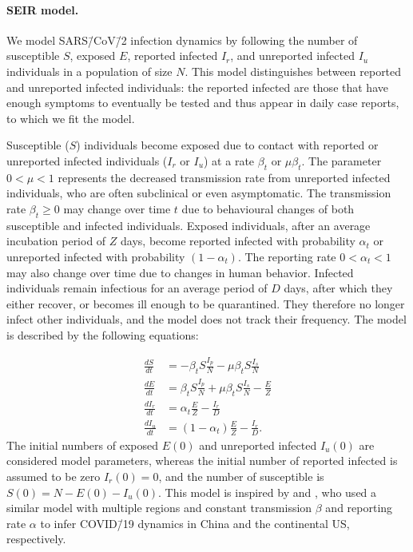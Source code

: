 \documentclass[12pt]{extarticle}
\begin{document}
\paragraph*{SEIR model.}
We model SARS\=/CoV\=/2 infection dynamics by following the number of susceptible $S$, exposed $E$, reported infected $I_r$, and unreported infected $I_u$ individuals in a population of size $N$.
This model distinguishes between reported and unreported infected individuals: the reported infected are those that have enough symptoms to eventually be tested and thus appear in daily case reports, to which we fit the model.

Susceptible ($S$) individuals become exposed due to contact with reported or unreported infected individuals ($I_r$ or $I_u$) at a rate $\beta_t$ or $\mu \beta_t$.
The parameter $0 < \mu < 1$ represents the decreased transmission rate from unreported infected individuals, who are often subclinical or even asymptomatic.
The transmission rate $\beta_t \ge 0$ may change over  time $t$ due to behavioural changes of both susceptible and infected individuals.
Exposed individuals, after an average incubation period of $Z$ days, become reported infected with probability $\alpha_t$ or unreported infected with probability $(1-\alpha_t)$.
The reporting rate $0 < \alpha_t < 1$ may also change over time due to changes in human behavior.
Infected individuals remain infectious for an average period of $D$ days, after which they either recover, or becomes ill enough to be quarantined.
They therefore no longer infect other individuals, and the model does not track their frequency.
The model is described by the following equations:

\begin{equation} \label{eq:model}
\begin{aligned}
\frac{dS}{dt} & = -\beta_t S \frac{I_p}{N} - \mu \beta_t S \frac{I_s}{N} \\
\frac{dE}{dt} & = \beta_t S \frac{I_p}{N} + \mu \beta_t S \frac{I_s}{N}  - \frac{E}{Z} \\
\frac{dI_r}{dt} & = \alpha_t \frac{E}{Z} - \frac{I_r}{D} \\
\frac{dI_u}{dt} & = (1-\alpha_t) \frac{E}{Z} - \frac{I_r}{D} .
\end{aligned}
\end{equation}
The initial numbers of exposed $E(0)$ and unreported infected $I_u(0)$ are considered model parameters, whereas the initial number of reported infected is assumed to be zero $I_r(0)=0$, and the number of susceptible is $S(0)=N-E(0)-I_u(0)$.
This model is inspired by \citet{Li2020} and \citet{Pei2020}, who used a similar model with multiple regions and constant transmission $\beta$ and reporting rate $\alpha$ to infer COVID\=/19 dynamics in China and the continental US, respectively.
\end{document}
